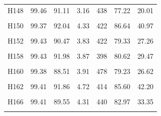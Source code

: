 \documentclass[
  a4paper,
  titlepage]{article}
\begin{document}
\begin{longtable}[t]{lllllll}
H148 & 99.46 & 91.11 & 3.16 & 438 & 77.22 & 20.01\\
 
\cellcolor{gray!6}{H149} & \cellcolor{gray!6}{99.43} & \cellcolor{gray!6}{91.26} & \cellcolor{gray!6}{3.67} & \cellcolor{gray!6}{412} & \cellcolor{gray!6}{81.40} & \cellcolor{gray!6}{27.09}\\
 
H150 & 99.37 & 92.04 & 4.33 & 422 & 86.64 & 40.97\\
 
\cellcolor{gray!6}{H151} & \cellcolor{gray!6}{99.37} & \cellcolor{gray!6}{90.69} & \cellcolor{gray!6}{4.54} & \cellcolor{gray!6}{418} & \cellcolor{gray!6}{84.54} & \cellcolor{gray!6}{38.43}\\
 
H152 & 99.43 & 90.47 & 3.83 & 422 & 79.33 & 27.26\\
 
\cellcolor{gray!6}{H157} & \cellcolor{gray!6}{99.45} & \cellcolor{gray!6}{91.44} & \cellcolor{gray!6}{4.38} & \cellcolor{gray!6}{415} & \cellcolor{gray!6}{83.99} & \cellcolor{gray!6}{36.60}\\
 
H158 & 99.43 & 91.98 & 3.87 & 398 & 80.62 & 29.47\\
 
\cellcolor{gray!6}{H159} & \cellcolor{gray!6}{99.50} & \cellcolor{gray!6}{91.74} & \cellcolor{gray!6}{4.12} & \cellcolor{gray!6}{385} & \cellcolor{gray!6}{81.67} & \cellcolor{gray!6}{32.14}\\
 
H160 & 99.38 & 88.51 & 3.91 & 478 & 79.23 & 26.62\\
 
\cellcolor{gray!6}{H161} & \cellcolor{gray!6}{99.47} & \cellcolor{gray!6}{91.55} & \cellcolor{gray!6}{4.48} & \cellcolor{gray!6}{393} & \cellcolor{gray!6}{83.91} & \cellcolor{gray!6}{37.49}\\
 
H162 & 99.41 & 91.86 & 4.72 & 414 & 85.60 & 42.20\\
 
\cellcolor{gray!6}{H164} & \cellcolor{gray!6}{99.39} & \cellcolor{gray!6}{90.79} & \cellcolor{gray!6}{4.98} & \cellcolor{gray!6}{416} & \cellcolor{gray!6}{85.59} & \cellcolor{gray!6}{43.76}\\
 
H166 & 99.41 & 89.55 & 4.31 & 440 & 82.97 & 33.35\\
 
\cellcolor{gray!6}{H167} & \cellcolor{gray!6}{99.40} & \cellcolor{gray!6}{90.45} & \cellcolor{gray!6}{4.28} & \cellcolor{gray!6}{392} & \cellcolor{gray!6}{77.39} & \cellcolor{gray!6}{29.67}\\
 

\end{longtable}
\end{document}
